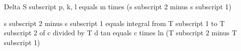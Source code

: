 Delta S subscript p, k, l equals m times (s subscript 2 minus s subscript 1)

s subscript 2 minus s subscript 1 equals integral from T subscript 1 to T subscript 2 of c divided by T d tau equals c times ln (T subscript 2 minus T subscript 1)